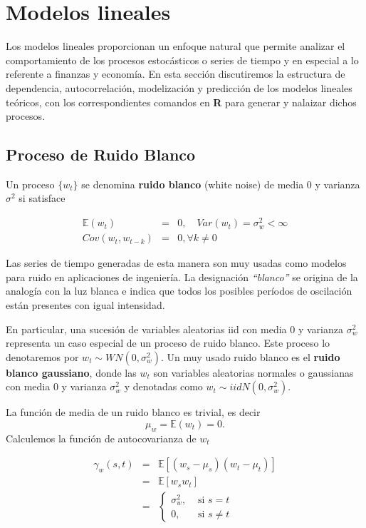 \documentclass[12pt,]{krantz}
\theoremstyle{definition}
\theoremstyle{definition}
\theoremstyle{definition}
\theoremstyle{remark}
\let\BeginKnitrBlock\begin \let\EndKnitrBlock\end
\begin{document}
\section{Modelos lineales}\label{modelos-lineales}

Los modelos lineales proporcionan un enfoque natural que permite
analizar el comportamiento de los procesos estocásticos o series de
tiempo y en especial a lo referente a finanzas y economía. En esta
sección discutiremos la estructura de dependencia, autocorrelación,
modelización y predicción de los modelos lineales teóricos, con los
correspondientes comandos en \textbf{R} para generar y nalaizar dichos
procesos.

\subsection{Proceso de Ruido Blanco}\label{proceso-de-ruido-blanco}

\BeginKnitrBlock{definition}
\protect\hypertarget{def:defi-ruido-blanco}{}{\label{def:defi-ruido-blanco}
}Un proceso \(\{w_t\}\) se denomina \textbf{ruido blanco} (white noise)
de media 0 y varianza \(\sigma^2\) si satisface

\begin{eqnarray*}
\mathbb{E}(w_t) &=& 0,\quad Var(w_t)=\sigma_w^2<\infty \\
Cov(w_t,w_{t-k}) &=& 0, \forall k\neq0
\end{eqnarray*}
\EndKnitrBlock{definition}

Las series de tiempo generadas de esta manera son muy usadas como
modelos para ruido en aplicaciones de ingeniería. La designación
\emph{``blanco''} se origina de la analogía con la luz blanca e indica
que todos los posibles períodos de oscilación están presentes con igual
intensidad.

En particular, una sucesión de variables aleatorias iid con media 0 y
varianza \(\sigma_w^2\) representa un caso especial de un proceso de
ruido blanco. Este proceso lo denotaremos por
\(w_t\sim WN(0,\sigma_w^2)\). Un muy usado ruido blanco es el
\textbf{ruido blanco gaussiano}, donde las \(w_t\) son variables
aleatorias normales o gaussianas con media 0 y varianza \(\sigma_w^2\) y
denotadas como \(w_t\sim iidN(0,\sigma_w^2)\).

La función de media de un ruido blanco es trivial, es decir
\[\mu_w=\mathbb{E}(w_t)=0.\] Calculemos la función de autocovarianza de
\(w_t\)

\begin{eqnarray*}
\gamma_w(s,t) &=& \mathbb{E}[(w_s-\mu_s)(w_t-\mu_t)] \\
      &=& \mathbb{E}[w_sw_t] \\
      &=& \begin{cases}
            \sigma_w^2, &\text{ si }s=t \\
            0, &\text{ si }s\neq t
          \end{cases}
\end{eqnarray*}
\end{document}
